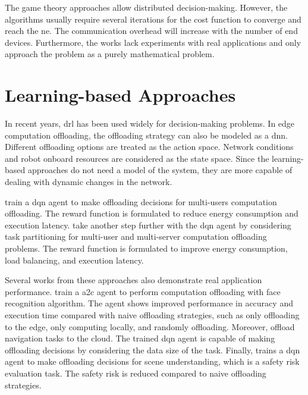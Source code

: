 The game theory approaches allow distributed decision-making. However, the algorithms usually require several iterations for the cost function to converge and reach the \gls{ne}. The communication overhead will increase with the number of end devices. Furthermore, the works lack experiments with real applications and only approach the problem as a purely mathematical problem. 

\section{Learning-based Approaches}

In recent years, \gls{drl} has been used widely for decision-making problems. In edge computation offloading, the offloading strategy can also be modeled as a \gls{dnn}. Different offloading options are treated as the action space. Network conditions and robot onboard resources are considered as the state space. Since the learning-based approaches do not need a model of the system, they are more capable of dealing with dynamic changes in the network. 

\citeauthor*{Huang2019} \cite{Huang2019} train a \gls{dqn} agent to make offloading decisions for multi-users computation offloading. The reward function is formulated to reduce energy consumption and execution latency. \citeauthor*{Lu2020} \cite{Lu2020} take another step further with the \gls{dqn} agent by considering task partitioning for multi-user and multi-server computation offloading problems. The reward function is formulated to improve energy consumption, load balancing, and execution latency. 

Several works from these approaches also demonstrate real application performance. \citeauthor*{Chinchali2019}  \cite{Chinchali2019} train a \gls{a2c} agent to perform computation offloading with face recognition algorithm. The agent shows improved performance in accuracy and execution time compared with naive offloading strategies, such as only offloading to the edge, only computing locally, and randomly offloading. Moreover, \citeauthor*{Penmetcha2021} \cite{Penmetcha2021} offload navigation tasks to the cloud. The trained \gls{dqn} agent is capable of making offloading decisions by considering the data size of the task. Finally, \citeauthor*{Ruggeri2022} \cite{Ruggeri2022} trains a \gls{dqn} agent to make offloading decisions for scene understanding, which is a safety risk evaluation task. The safety risk is reduced compared to naive offloading strategies. 

